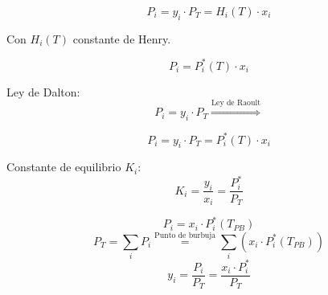             
            \begin{quote}
                \textit{}
            \end{quote}
            
            \begin{equation}
            \label{eq:ley_henry}
                P_{i} = y_{i} \cdot P_{T} = H_{i}(T) \cdot x_{i}
            \end{equation}
            
            Con \(H_{i}(T)\) constante de Henry.
        
        
            \begin{quote}
                \textit{}
            \end{quote}
            
            \[P_{i} = P_{i}^{*}(T) \cdot x_{i}\]
            
            Ley de Dalton:
            \[P_{i} = y_{i} \cdot P_{T} \overset{\text{Ley de Raoult}}{\Rightarrow}\]
            
            \begin{equation}
            \label{eq:ley_raoult}
                P_{i} = y_{i} \cdot P_{T} = P_{i}^{*}(T) \cdot x_{i}
            \end{equation}
            
            Constante de equilibrio \(K_{i}\):
            \[K_{i} = \frac{y_{i}}{x_{i}} = \frac{P_{i}^{*}}{P_{T}}\]
            \begin{quote}
                \textit{}
            \end{quote}
        
            
            \begin{quote}
                \textit{}
            \end{quote}
            \[P_{i} = x_{i} \cdot P_{i}^{*} \left ( T_{PB} \right )\]
            \[P_{T} = \sum_{i} P_{i} \overset{\text{Punto de burbuja}}{=} \sum_{i} \left ( x_{i} \cdot P_{i}^{*} \left ( T_{PB} \right ) \right )\]
            \begin{equation}
            \label{eq:punto_burbuja}
                y_{i} = \frac{P_{i}}{P_{T}} = \frac{x_{i} \cdot P_{i}^{*}}{P_{T}}
            \end{equation}
            
